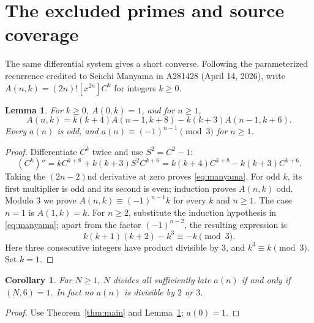 \documentclass[11pt]{article}
\newtheorem{lemma}[theorem]{Lemma}
\newtheorem{corollary}[theorem]{Corollary}
\newcommand{\coeff}[2]{[#1]#2}
\begin{document}
\section{The excluded primes and source coverage}
The same differential system gives a short converse. Following the
parameterized recurrence credited to Seiichi Manyama in A281428
(April 14, 2026), write
$A(n,k)=(2n)!\coeff{x^{2n}}{C^k}$ for integers $k\geq0$.
\begin{lemma}\label{lem:columns}
For $k\geq0$, $A(0,k)=1$, and for $n\geq1$,
\begin{equation}\label{eq:manyama}
A(n,k)=k(k+4)A(n-1,k+8)-k(k+3)A(n-1,k+6).
\end{equation}
Every $a(n)$ is odd, and $a(n)\equiv(-1)^{n-1}\pmod3$ for $n\geq1$.
\end{lemma}
\begin{proof}
Differentiate $C^k$ twice and use $S^2=C^2-1$:
\[
(C^k)''=kC^{k+8}+k(k+3)S^2C^{k+6}
=k(k+4)C^{k+8}-k(k+3)C^{k+6}.
\]
Taking the $(2n-2)$nd derivative at zero proves \eqref{eq:manyama}.
For odd $k$, its first multiplier is odd and its second is even;
induction proves $A(n,k)$ odd.
Modulo $3$ we prove $A(n,k)\equiv(-1)^{n-1}k$ for every $k$ and $n\geq1$.
The case $n=1$ is $A(1,k)=k$. For $n\geq2$, substitute the induction
hypothesis in \eqref{eq:manyama}; apart from the factor $(-1)^{n-2}$,
the resulting expression is
\[
k(k+1)(k+2)-k^3\equiv-k\pmod3.
\]
Here three consecutive integers have product divisible by $3$, and
$k^3\equiv k\pmod3$. Set $k=1$.
\end{proof}
\begin{corollary}
For $N\geq1$, $N$ divides all sufficiently late $a(n)$ if and only if
$(N,6)=1$. In fact no $a(n)$ is divisible by $2$ or $3$.
\end{corollary}
\begin{proof}
Use Theorem~\ref{thm:main} and Lemma~\ref{lem:columns}; $a(0)=1$.
\end{proof}
\end{document}
